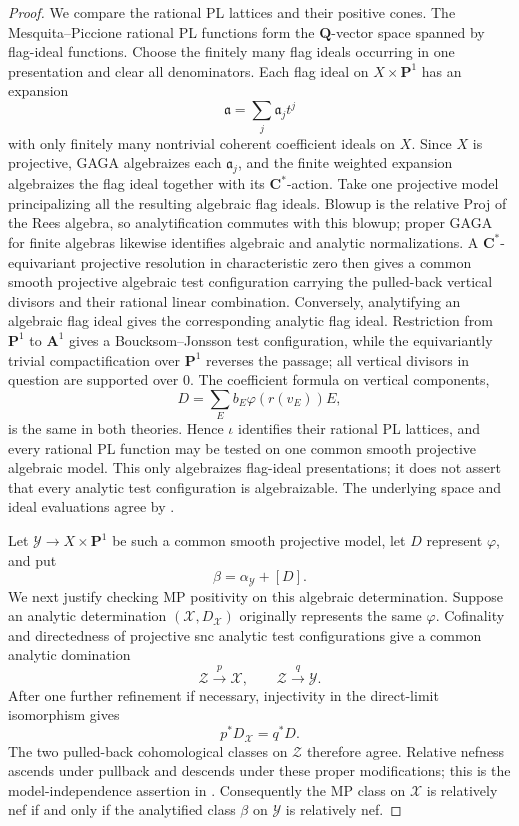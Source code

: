 \begin{proof}
We compare the rational PL lattices and their positive cones.  The
Mesquita--Piccione rational PL functions form the $\mathbf Q$-vector
space spanned by flag-ideal functions.  Choose the finitely many flag
ideals occurring in one presentation and clear all denominators.  Each
flag ideal on $X\times\mathbf P^1$ has an expansion
\[
                    \mathfrak a=\sum_j\mathfrak a_jt^j
\]
with only finitely many nontrivial coherent coefficient ideals on $X$.
Since $X$ is projective, GAGA algebraizes each $\mathfrak a_j$, and
the finite weighted expansion algebraizes the flag ideal together with
its $\mathbf C^*$-action.  Take one projective model principalizing all
the resulting algebraic flag ideals.  Blowup is the relative Proj of the
Rees algebra, so analytification commutes with this blowup; proper GAGA for
finite algebras likewise identifies algebraic and analytic normalizations.
A $\mathbf C^*$-equivariant projective resolution in characteristic zero
then gives a common smooth projective algebraic test configuration carrying
the pulled-back vertical divisors and their rational linear combination.
Conversely, analytifying an algebraic flag ideal gives the corresponding
analytic flag ideal.  Restriction from $\mathbf P^1$ to
$\mathbf A^1$ gives a Boucksom--Jonsson test configuration, while the
equivariantly trivial compactification over $\mathbf P^1$ reverses the
passage; all vertical divisors in question are supported over $0$.
The coefficient formula on vertical components,
\[
                    D=\sum_E b_E\varphi(r(v_E))E,
\]
is the same in both theories.  Hence $\iota$ identifies their rational
PL lattices, and every rational PL function may be tested on one common
smooth projective algebraic model.  This only algebraizes flag-ideal
presentations; it does not assert that every analytic test configuration
is algebraizable.  The underlying space and ideal evaluations agree by
\cite[Remark~1.3.3]{MP24}.

Let $\mathcal Y\to X\times\mathbf P^1$ be such a common smooth
projective model, let $D$ represent $\varphi$, and put
\[
                         \beta=\alpha_{\mathcal Y}+[D].
\]
We next justify checking MP positivity on this algebraic determination.
Suppose an analytic determination
$(\mathcal X,D_{\mathcal X})$ originally represents the same
$\varphi$.  Cofinality and directedness of projective snc analytic test
configurations \cite[Remark~2.5.2]{MP24} give a common analytic domination
\[
 \mathcal Z\xrightarrow{p}\mathcal X,
 \qquad
 \mathcal Z\xrightarrow{q}\mathcal Y.
\]
After one further refinement if necessary, injectivity in the direct-limit
isomorphism \cite[Theorem~2.6.4]{MP24} gives
\[
                  p^*D_{\mathcal X}=q^*D.
\]
The two pulled-back cohomological classes on $\mathcal Z$ therefore
agree.  Relative nefness ascends under pullback and descends under these
proper modifications; this is the model-independence assertion in
\cite[Definition~4.1.2 and the proof of Theorem~4.1.5]{MP24}.
Consequently the MP class on $\mathcal X$ is relatively nef if and only
if the analytified class $\beta$ on $\mathcal Y$ is relatively nef.


\end{proof}
